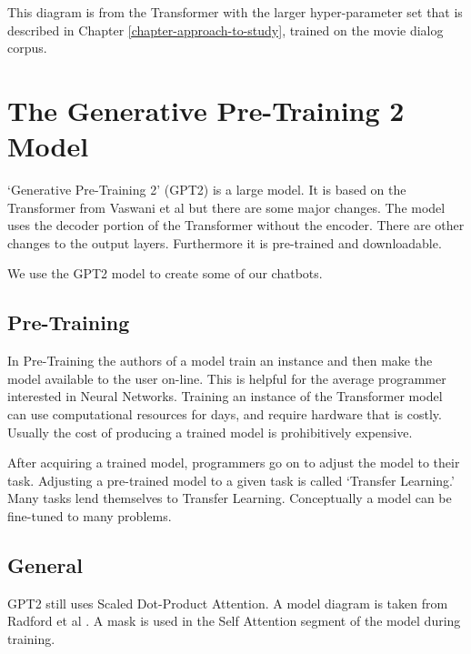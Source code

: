 This diagram is from the Transformer with the larger hyper-parameter set that is described in Chapter \ref{chapter-approach-to-study}, trained on the movie dialog corpus.


\section{The Generative Pre-Training 2 Model}

`Generative Pre-Training 2' (\ac{GPT2}) is a large model. It is based on the Transformer from Vaswani et al \cite{Vaswani2017AttentionIA} but there are some major changes. The model uses the decoder portion of the Transformer without the encoder. There are other changes to the output layers. Furthermore it is pre-trained and downloadable.

We use the GPT2 model to create some of our chatbots.


\subsection{Pre-Training}
In Pre-Training the authors of a model train an instance and then make the model available to the user on-line. This is helpful for the average programmer interested in Neural Networks. Training an instance of the Transformer model can use computational resources for days, and require hardware that is costly. Usually the cost of producing a trained model is prohibitively expensive.

After acquiring a trained model, programmers go on to adjust the model to their task. Adjusting a pre-trained model to a given task is called `Transfer Learning.' Many tasks lend themselves to Transfer Learning. Conceptually a model can be fine-tuned to many problems. %


\subsection{General}
GPT2 still uses Scaled Dot-Product Attention. A model diagram is taken from Radford et al \cite{radford2018improving}. A mask is used in the Self Attention segment of the model during training.


